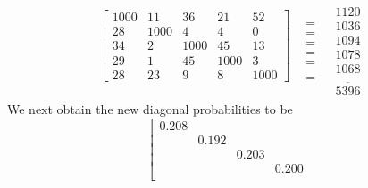\begin{example}
\begin{equation}
\begin{array}{*{20}{c}}
{\left[ {\begin{array}{*{20}{c}}
{1000}&{11}&{36}&{21}&{52}\\
{28}&{1000}&4&4&0\\
{34}&2&{1000}&{45}&{13}\\
{29}&1&{45}&{1000}&3\\
{28}&{23}&9&8&{1000}
\end{array}} \right]}\\
{\begin{array}{*{20}{c}}
{}&{}&{}&{}&{}
\end{array}}
\end{array}\begin{array}{*{20}{c}}
{\begin{array}{*{20}{c}}
 = \\
 = \\
 = \\
 = \\
 = 
\end{array}}\\
{\begin{array}{*{20}{c}}
 = 
\end{array}}
\end{array}\begin{array}{*{20}{c}}
{\begin{array}{*{20}{c}}
{1120}\\
{1036}\\
{1094}\\
{1078}\\
{1068}
\end{array}}\\
{\overline {\begin{array}{*{20}{c}}
{5396}
\end{array}} }
\end{array}
\end{equation}
We next obtain the new diagonal probabilities to be
\begin{equation}
\left [ \begin{array}{ccccc}
0.208 & & & & \\
& 0.192 & & &\\
& & 0.203 & & \\
& & & 0.200 & \\

\end{array}
\end{equation}
\end{example}

